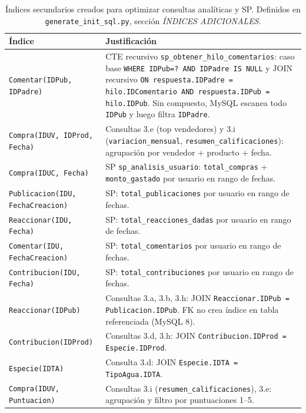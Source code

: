 \documentclass[11pt, a4paper]{article}
\begin{document}
\begin{table}[H]
\centering
\small
\begin{tabular}{
    >{\raggedright\arraybackslash}p{3.5cm}
    >{\raggedright\arraybackslash}p{10.3cm}}
\toprule
\textbf{Índice} & \textbf{Justificación} \\
\midrule
\texttt{Comentar(IDPub, IDPadre)} & CTE recursivo \texttt{sp\_obtener\_hilo\_comentarios}: caso base \texttt{WHERE IDPub=? AND IDPadre IS NULL} y JOIN recursivo \texttt{ON respuesta.IDPadre = hilo.IDComentario AND respuesta.IDPub = hilo.IDPub}. Sin compuesto, MySQL escanea todo \texttt{IDPub} y luego filtra \texttt{IDPadre}. \\
\midrule
\texttt{Compra(IDUV, IDProd, Fecha)} & Consultas 3.e (top vendedores) y 3.i (\texttt{variacion\_mensual}, \texttt{resumen\_calificaciones}): agrupación por vendedor + producto + fecha. \\
\texttt{Compra(IDUC, Fecha)} & SP \texttt{sp\_analisis\_usuario}: \texttt{total\_compras} + \texttt{monto\_gastado} por usuario en rango de fechas. \\
\texttt{Publicacion(IDU, FechaCreacion)} & SP: \texttt{total\_publicaciones} por usuario en rango de fechas. \\
\texttt{Reaccionar(IDU, Fecha)} & SP: \texttt{total\_reacciones\_dadas} por usuario en rango de fechas. \\
\texttt{Comentar(IDU, FechaCreacion)} & SP: \texttt{total\_comentarios} por usuario en rango de fechas. \\
\texttt{Contribucion(IDU, Fecha)} & SP: \texttt{total\_contribuciones} por usuario en rango de fechas. \\
\midrule
\texttt{Reaccionar(IDPub)} & Consultas 3.a, 3.b, 3.h: JOIN \texttt{Reaccionar.IDPub = Publicacion.IDPub}. FK no crea índice en tabla referenciada (MySQL 8). \\
\texttt{Contribucion(IDProd)} & Consultas 3.d, 3.h: JOIN \texttt{Contribucion.IDProd = Especie.IDProd}. \\
\texttt{Especie(IDTA)} & Consulta 3.d: JOIN \texttt{Especie.IDTA = TipoAgua.IDTA}. \\
\texttt{Compra(IDUV, Puntuacion)} & Consultas 3.i (\texttt{resumen\_calificaciones}), 3.e: agrupación y filtro por puntuaciones 1--5. \\
\bottomrule
\end{tabular}
\caption{Índices secundarios creados para optimizar consultas analíticas y SP. Definidos en \texttt{generate\_init\_sql.py}, sección \textit{ÍNDICES ADICIONALES}.}
\label{tab:indices}
\end{table}
\end{document}
